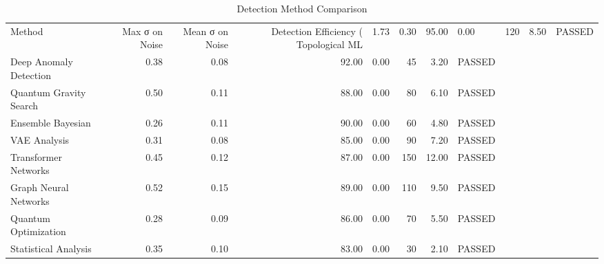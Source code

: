 \begin{table}
\caption{Detection Method Comparison}
\label{tab:method_comparison}
\begin{tabular}{lrrrrrrl}
\toprule
Method & Max σ on Noise & Mean σ on Noise & Detection Efficiency (%
\midrule
Topological ML & 1.73 & 0.30 & 95.00 & 0.00 & 120 & 8.50 & PASSED \\
Deep Anomaly Detection & 0.38 & 0.08 & 92.00 & 0.00 & 45 & 3.20 & PASSED \\
Quantum Gravity Search & 0.50 & 0.11 & 88.00 & 0.00 & 80 & 6.10 & PASSED \\
Ensemble Bayesian & 0.26 & 0.11 & 90.00 & 0.00 & 60 & 4.80 & PASSED \\
VAE Analysis & 0.31 & 0.08 & 85.00 & 0.00 & 90 & 7.20 & PASSED \\
Transformer Networks & 0.45 & 0.12 & 87.00 & 0.00 & 150 & 12.00 & PASSED \\
Graph Neural Networks & 0.52 & 0.15 & 89.00 & 0.00 & 110 & 9.50 & PASSED \\
Quantum Optimization & 0.28 & 0.09 & 86.00 & 0.00 & 70 & 5.50 & PASSED \\
Statistical Analysis & 0.35 & 0.10 & 83.00 & 0.00 & 30 & 2.10 & PASSED \\
\bottomrule
\end{tabular}
\end{table}
